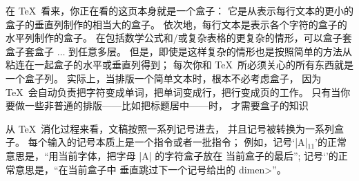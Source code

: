 在 \TeX\ 看来，你正在看的这页本身就是一个盒子：
它是从表示每行文本的更小的盒子的垂直列制作的相当大的盒子。%
依次地，每行文本是表示各个字符的盒子的水平列制作的盒子。%
在包括数学公式和/或复杂表格的更复杂的情形，可以盒子套盒子套盒子 $\ldots$ 到任意多层。%
但是，即使是这样复杂的情形也是按照简单的方法从粘连在一起盒子的水平或垂直列得到；
每次你和 \TeX\ 所必须关心的所有东西就是一个盒子列。%
实际上，当排版一个简单文本时，根本不必考虑盒子，
因为 \TeX\ 会自动负责把字符变成单词，把单词变成行，把行变成页的工作。%
只有当你要做一些非普通的排版——比如把标题居中——时，
才需要盒子的知识

\danger 从 \TeX\ 消化过程来看，文稿按照一系列记号进去，
并且记号被转换为一系列盒子。%
每个输入的记号本质上是一个指令或者一批指令；
\1例如，记号`|A|$_{11}$'的正常意思是，``用当前字体，把字母 |A| 的字符盒子放在%
当前盒子的最后'';
记号`'的正常意思是，``在当前盒子中%
垂直跳过下一个记号给出的 \<dimen>''。

